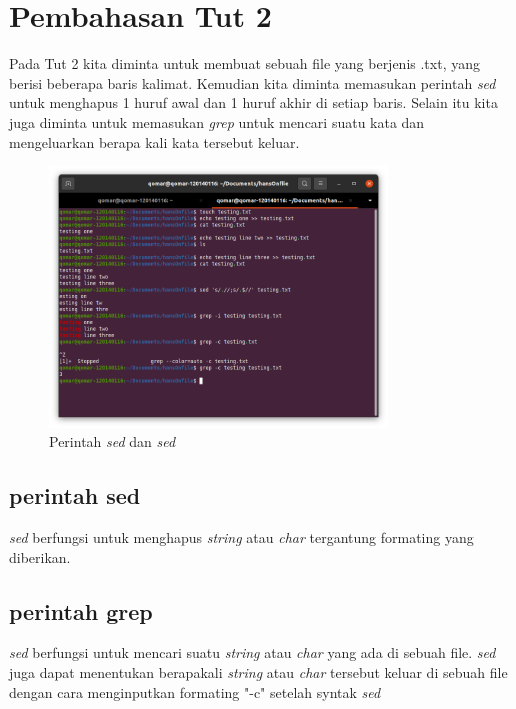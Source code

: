 \documentclass[11pt,a4paper]{article}
\begin{document}
\section{Pembahasan Tut 2}
	Pada Tut 2 kita diminta untuk membuat sebuah file yang berjenis .txt, yang berisi beberapa baris kalimat. 
	Kemudian kita diminta memasukan perintah \textit{sed} untuk menghapus 1 huruf awal dan 1 huruf akhir di setiap baris.
	Selain itu kita juga diminta untuk memasukan \textit{grep} untuk mencari suatu kata dan mengeluarkan berapa kali kata tersebut keluar.
	\begin{figure}[h]
		\centering
		\includegraphics[width=0.8\textwidth]{figure/tut2.png}
		\caption{Perintah \textit{sed} dan \textit{sed}}
	\end{figure}
\subsection*{perintah sed}
	\textit{sed} berfungsi untuk menghapus \textit{string} atau \textit{char} tergantung formating yang diberikan.
	
\subsection*{perintah grep}
	\textit{sed} berfungsi untuk mencari suatu \textit{string} atau \textit{char} yang ada di sebuah file. \textit{sed} juga dapat menentukan berapakali \textit{string} atau \textit{char} tersebut keluar di sebuah file dengan cara menginputkan formating "-c" setelah syntak \textit{sed} 

\newpage
\end{document}
